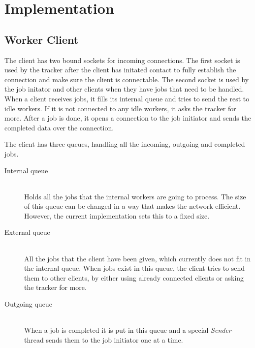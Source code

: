 \chapter{Implementation}


\section{Worker Client}
The client has two bound sockets for incoming connections. The first socket is used by the tracker after the client has initated contact to fully establish the connection and make sure the client is connectable.
The second socket is used by the job initator and other clients when they have jobs that need to be handled.
When a client receives jobs, it fills its internal queue and tries to send the rest to idle workers.
If it is not connected to any idle workers, it asks the tracker for more.
After a job is done, it opens a connection to the job initiator and sends the completed data over the connection.

The client has three queues, handling all the incoming, outgoing and completed jobs.
\begin{description}
	\item[Internal queue] \hfill \\
	Holds all the jobs that the internal workers are going to process. The size of this queue can be changed in a way that makes the network efficient. However, the current implementation sets this to a fixed size.
	\item[External queue] \hfill \\
	All the jobs that the client have been given, which currently does not fit in the internal queue.
	When jobs exist in this queue, the client tries to send them to other clients, by either using already connected clients or asking the tracker for more.
	\item[Outgoing queue] \hfill \\
	When a job is completed it is put in this queue and a special \textit{Sender}-thread sends them to the job initiator one at a time.
\end{description}

